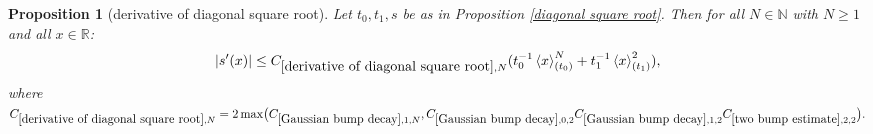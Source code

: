 \documentclass[12pt,reqno]{amsart}
\theoremstyle{plain}
\newtheorem{proposition}[theorem]{Proposition}
\numberwithin{equation}{section}
\theoremstyle{remark}
\newcommand{\uses}[1]{}
\newcommand{\usesdefs}[1]{}
\newcommand{\R}{{\mathbb R}}
\newcommand{\N}{{\mathbb N}}
\begin{document}
\begin{proposition}[derivative of diagonal square root]\label{derivative of diagonal square root}\uses{square root of Gaussian decay,Elementary Gaussian properties,Gaussian bump decay,two bump estimate,diagonal square root}\usesdefs{gaussian,bracket bump}
Let $t_0,t_1,s$ be as in Proposition \ref{diagonal square root}.
Then for all $N\in\N$ with $N\ge1$ and all $x\in\R$:
\begin{equation}\label{E:s-derivative-estimate}
    |s'(x)|\le  C_{\ref{derivative of diagonal square root},N} ( t_0^{-1} \left<x\right>^N_{(t_0)}+ t_1^{-1}\left<x\right>^2_{(t_1)}),
\end{equation}
where
$C_{\ref{derivative of diagonal square root},N}
=
2\max\bigl(
C_{\ref{Gaussian bump decay},1,N},
C_{\ref{Gaussian bump decay},0,2}
C_{\ref{Gaussian bump decay},1,2}
C_{\ref{two bump estimate},2,2}
\bigr).$
\end{proposition}
\end{document}
